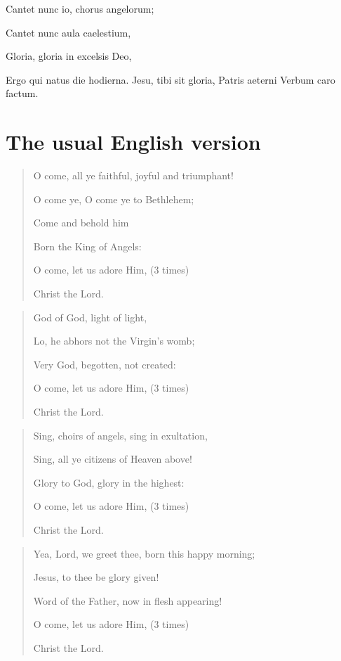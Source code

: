 \documentclass[a4paper]{article}
\begin{document}
\begin{exe}

\sn
\gll Cantet nunc io, chorus angelorum;

\sn
\gll Cantet nunc aula caelestium,

\sn
\gll Gloria, gloria in excelsis Deo,

\end{exe}

Ergo qui natus die hodierna.
Jesu, tibi sit gloria,
Patris aeterni Verbum caro factum.

\section{The usual English version}

\begin{quotation}
    O come, all ye faithful, joyful and triumphant!

    O come ye, O come ye to Bethlehem;

    Come and behold him

    Born the King of Angels:
    
    O come, let us adore Him, (3 times)
    
    Christ the Lord.
\end{quotation}

\begin{quotation}
    God of God, light of light,

    Lo, he abhors not the Virgin's womb;
    
    Very God, begotten, not created:
    
    O come, let us adore Him, (3 times)
    
    Christ the Lord.
\end{quotation}

\begin{quotation}
    Sing, choirs of angels, sing in exultation,
    
    Sing, all ye citizens of Heaven above!
    
    Glory to God, glory in the highest:
    
    O come, let us adore Him, (3 times)
    
    Christ the Lord.
\end{quotation}

\begin{quotation}
    Yea, Lord, we greet thee, born this happy morning;
    
    Jesus, to thee be glory given!
    
    Word of the Father, now in flesh appearing!
    
    O come, let us adore Him, (3 times)
    
    Christ the Lord.
\end{quotation}



\end{document}

